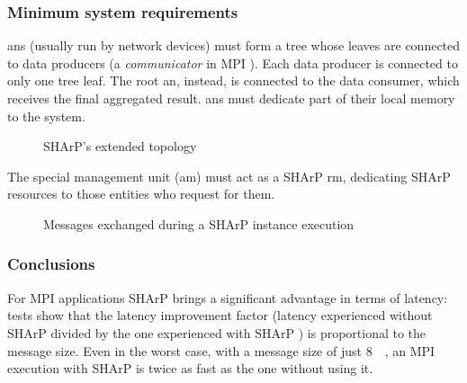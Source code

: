 \subsubsection{Minimum system requirements}
\glspl{an} (usually run by network devices) must form a tree whose leaves are connected to data producers (a \textit{communicator} in MPI \cite{mpi}).
Each data producer is connected to only one tree leaf.
The root \gls{an}, instead, is connected to the data consumer, which receives the final aggregated result.
\glspl{an} must dedicate part of their local memory to the system.

\begin{figure}[!htb]
    \centering
    \usebox{\sharpextended}
    \caption{SHArP's \texorpdfstring{\cite{sharp}}{} extended topology}
\end{figure}

The special management unit (\gls{am}) must act as a SHArP \cite{sharp} \gls{rm}, dedicating SHArP \cite{sharp} resources to those entities who request for them.

\begin{figure}[!htb]
    \centering
    \usebox{\sharpsd}
    \caption{Messages exchanged during a SHArP \texorpdfstring{\cite{sharp}}{} instance execution}
\end{figure}

\subsubsection{Conclusions}
For MPI \cite{mpi} applications SHArP \cite{sharp} brings a significant advantage in terms of latency: tests show that the latency improvement factor (latency experienced without SHArP \cite{sharp} divided by the one experienced with SHArP \cite{sharp}) is proportional to the message size.
Even in the worst case, with a message size of just \SI{8}{\mega\byte}, an MPI \cite{mpi} execution with SHArP \cite{sharp} is twice as fast as the one without using it.